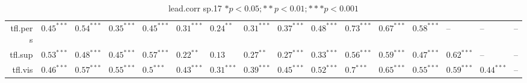 \begin{table}[ht]
\begin{tabular}{rlllllllllllllll}
  tfl.pers & $0.45^{***}$ & $0.54^{***}$ & $0.35^{***}$ & $0.45^{***}$ & $0.31^{***}$ & $0.24^{**}$ & $0.31^{***}$ & $0.37^{***}$ & $0.48^{***}$ & $0.73^{***}$ & $0.67^{***}$ & $0.58^{***}$ & -- & -- & -- \\ 
  tfl.sup & $0.53^{***}$ & $0.48^{***}$ & $0.45^{***}$ & $0.57^{***}$ & $0.22^{**}$ & $0.13$ & $0.27^{**}$ & $0.27^{***}$ & $0.33^{***}$ & $0.56^{***}$ & $0.59^{***}$ & $0.47^{***}$ & $0.62^{***}$ & -- & -- \\ 
  tfl.vis & $0.46^{***}$ & $0.57^{***}$ & $0.55^{***}$ & $0.5^{***}$ & $0.43^{***}$ & $0.31^{***}$ & $0.39^{***}$ & $0.45^{***}$ & $0.52^{***}$ & $0.7^{***}$ & $0.65^{***}$ & $0.55^{***}$ & $0.59^{***}$ & $0.44^{***}$ & -- \\ 
   \hline
\end{tabular}
\caption{lead.corr sp.17 $* p < 0.05; ** p < 0.01; *** p < 0.001$} 
\label{freq_corr.lead.corr.sp.17}
\end{table}
